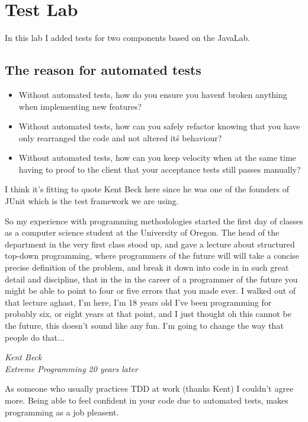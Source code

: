 \section{Test Lab}

In this lab I added tests for two components based on the JavaLab.

\subsection{The reason for automated tests}
\begin{itemize}
        \item Without automated tests, how do you ensure you haven\'t broken
                anything when implementing new features?
        \item Without automated tests, how can you safely refactor knowing that you have only
                rearranged the code and not altered it\'s behaviour?
        \item Without automated tests, how can you keep velocity when at the
                same time having to proof to the client that your acceptance
                tests still passes manually?
\end{itemize}
I think it's fitting to quote Kent Beck \cite{kent-beck-xp-history} here since he was one of the founders of
JUnit which is the test framework we are using.

\epigraph{So my experience with programming methodologies started the first day of classes as a computer
science student at the University of Oregon.
The head of the department in the very first class stood up, and gave a
lecture about structured top-down programming, where programmers of the
future will will take a concise precise definition of the problem, and break it
down into code in in such great detail and discipline, that in the in the career
of a programmer of the future you might be able to point to four or five errors
that you made ever. I walked out of that lecture aghast, I'm here, I'm 18
years old I've been programming for probably six, or eight years at that
point, and I just thought oh this cannot be the future, this doesn't sound like
any fun. I'm going to change the way that
people do that...}{\textit{Kent Beck \\ Extreme Programming 20 years later
}}

As someone who usually practices TDD at work (thanks Kent) I couldn't agree
more. Being able to feel confident in your code due to automated tests, makes
programming as a job pleasent.


